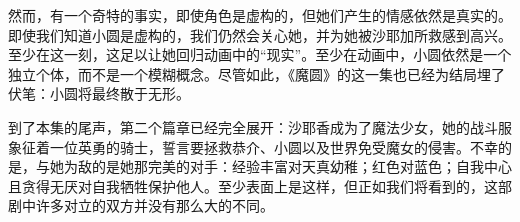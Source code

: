 然而，有一个奇特的事实，即使角色是虚构的，但她们产生的情感依然是真实的。即使我们知道小圆是虚构的，我们仍然会关心她，并为她被沙耶加所救感到高兴。至少在这一刻，这足以让她回归动画中的“现实”。至少在动画中，小圆依然是一个独立个体，而不是一个模糊概念。尽管如此，《魔圆》的这一集也已经为结局埋了伏笔：小圆将最终散于无形。

到了本集的尾声，第二个篇章已经完全展开：沙耶香成为了魔法少女，她的战斗服象征着一位英勇的骑士，誓言要拯救恭介、小圆以及世界免受魔女的侵害。不幸的是，与她为敌的是她那完美的对手：经验丰富对天真幼稚；红色对蓝色；自我中心且贪得无厌对自我牺牲保护他人。至少表面上是这样，但正如我们将看到的，这部剧中许多对立的双方并没有那么大的不同。

